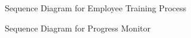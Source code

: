 \documentclass[a4paper,11pt]{article}
\begin{document}
\begin{figure}
    \centering
    \caption{Sequence Diagram for Employee Training Process}
    \label{fig:s2}
\end{figure}
\begin{figure}
    \centering
    \caption{Sequence Diagram for Progress Monitor}
    \label{fig:s3}
\end{figure}
\end{document}
